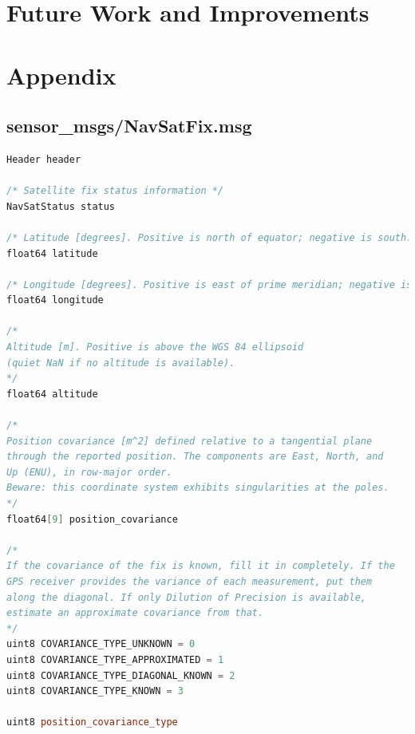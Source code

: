 \documentclass[titlepage,12pt,a4paper]{article}
\begin{document}
\pagebreak
\section{Future Work and Improvements}

\pagebreak
\section{Appendix}


\subsection{sensor\_msgs/NavSatFix.msg}
\begin{lstlisting}[language=C++]
Header header

/* Satellite fix status information */
NavSatStatus status

/* Latitude [degrees]. Positive is north of equator; negative is south. */
float64 latitude

/* Longitude [degrees]. Positive is east of prime meridian; negative is west. */
float64 longitude

/*
Altitude [m]. Positive is above the WGS 84 ellipsoid
(quiet NaN if no altitude is available).
*/
float64 altitude

/*
Position covariance [m^2] defined relative to a tangential plane
through the reported position. The components are East, North, and
Up (ENU), in row-major order.
Beware: this coordinate system exhibits singularities at the poles.
*/
float64[9] position_covariance

/*
If the covariance of the fix is known, fill it in completely. If the
GPS receiver provides the variance of each measurement, put them
along the diagonal. If only Dilution of Precision is available,
estimate an approximate covariance from that.
*/
uint8 COVARIANCE_TYPE_UNKNOWN = 0
uint8 COVARIANCE_TYPE_APPROXIMATED = 1
uint8 COVARIANCE_TYPE_DIAGONAL_KNOWN = 2
uint8 COVARIANCE_TYPE_KNOWN = 3

uint8 position_covariance_type
\end{lstlisting}
\end{document}
